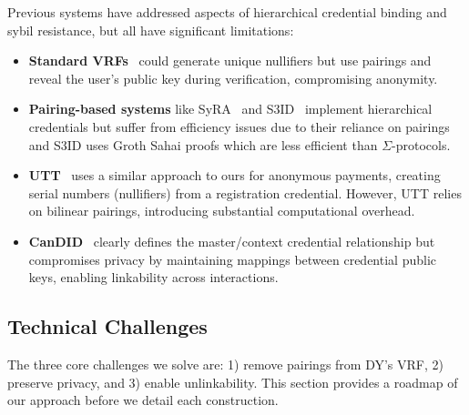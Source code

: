 Previous systems have addressed aspects of hierarchical credential binding and sybil resistance, but all have significant limitations:

\begin{itemize}
    
    \item \textbf{Standard VRFs}~\cite{hutchison_verifiable_2005, goldberg_nsec5_2015} could generate unique nullifiers but use pairings and reveal the user's public key during verification, compromising anonymity.
        
    \item \textbf{Pairing-based systems} like SyRA~\cite{crites_syra_2024} and S3ID~\cite{rabaninejad_attribute-based_2024} implement hierarchical credentials but suffer from efficiency issues due to their reliance on pairings and S3ID uses Groth Sahai proofs which are less efficient than $\Sigma$-protocols.
    
    \item \textbf{UTT}~\cite{tomescu2022utt} uses a similar approach to ours for anonymous payments, creating serial numbers (nullifiers) from a registration credential. However, UTT relies on bilinear pairings, introducing substantial computational overhead.
    
    \item \textbf{CanDID}~\cite{maram2021candid} clearly defines the master/context credential relationship but compromises privacy by maintaining mappings between credential public keys, enabling linkability across interactions.

\end{itemize}


\subsection{Technical Challenges}\label{sec:technical-challenges}

The three core challenges we solve are: 1) remove pairings from DY's VRF, 2) preserve privacy, and 3) enable unlinkability. This section provides a roadmap of our approach before we detail each construction.

